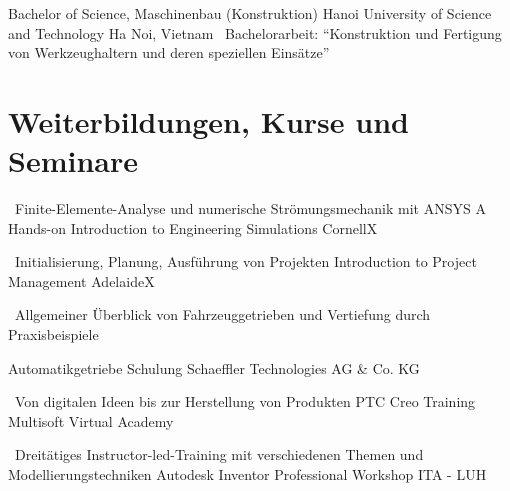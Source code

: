 \documentclass[11pt,a4paper,sans]{moderncv}
\begin{document}
{Bachelor of Science, Maschinenbau (Konstruktion)}
{Hanoi University of Science and Technology}
{Ha Noi, Vietnam}
{}
{
    \ Bachelorarbeit: ``Konstruktion und Fertigung von Werkzeughaltern und deren speziellen Einsätze''
}


\section{\textbf{Weiterbildungen, Kurse und Seminare}}

{\ Finite-Elemente-Analyse und numerische Strömungsmechanik mit ANSYS}
{A Hands-on Introduction to Engineering Simulations}
{CornellX}
{}
{}


{\ Initialisierung, Planung, Ausführung von Projekten}
{Introduction to Project Management}
{AdelaideX}
{}
{}


{
\parbox[t]{10cm}{\ Allgemeiner Überblick von Fahrzeuggetrieben und Vertiefung durch Praxisbeispiele}
}
{Automatikgetriebe Schulung}
{Schaeffler Technologies AG \& Co. KG}
{}
{}


{\ Von digitalen Ideen bis zur Herstellung von Produkten}
{PTC Creo Training}
{Multisoft Virtual Academy}
{}
{}



{\ Dreitätiges Instructor-led-Training mit verschiedenen Themen und Modellierungstechniken}
{Autodesk Inventor Professional Workshop}
{ITA - LUH}
{}
{}



\end{document}
